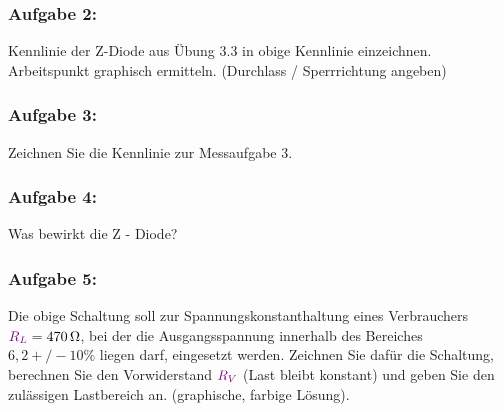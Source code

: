 \documentclass[11pt,a4paper,titlepage,parskip=half]{scrreprt}
\begin{document}
			\subsubsection{Aufgabe 2:} Kennlinie der Z-Diode aus Übung 3.3 in obige Kennlinie einzeichnen. Arbeitspunkt graphisch ermitteln. (Durchlass / Sperrrichtung angeben)
            
             
			\subsubsection{Aufgabe 3:} Zeichnen Sie die Kennlinie zur Messaufgabe 3.


			\subsubsection{Aufgabe 4:} Was bewirkt die Z - Diode?
            

			\subsubsection{Aufgabe 5:} Die obige Schaltung soll zur Spannungskonstanthaltung eines Verbrauchers $\textcolor{violet}{R_L} = \SI{470}{\ohm}$, bei der die Ausgangsspannung innerhalb des Bereiches $6,2 +/- 10\%$ liegen darf, eingesetzt werden. Zeichnen Sie dafür die Schaltung, berechnen Sie den Vorwiderstand $\textcolor{violet}{R_V}$ (Last bleibt konstant) und geben Sie den zulässigen Lastbereich an. (graphische, farbige Lösung).
            
        

    \listoftables
\end{document}
